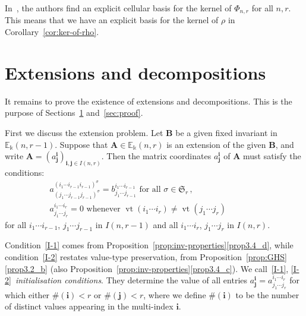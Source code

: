 \documentclass[ALCO,ThmDefs,Unicode,epreuves]{cedram}
\DeclareMathOperator{\vt}{vt}
\newcommand{\E}{\mathbb{E}}
\newcommand{\Sym}{\mathfrak{S}}
\newcommand{\bi}{{\boldsymbol{i}}} %
\newcommand{\bj}{{\boldsymbol{j}}}
\newcommand{\bA}{\mathbf{A}}
\newcommand{\bB}{\mathbf{B}}
\begin{document}
In~\cite{BDM:second}, the authors find an explicit cellular basis for
the kernel of $\Phi_{n,r}$ for all $n,r$. This means that we have an
explicit basis for the kernel of $\rho$ in Corollary~\ref{cor:ker-of-rho}. 



\section{Extensions and decompositions}\label{sec:extensions}%
It remains to prove the existence of extensions and
decompositions. This is the purpose of Sections~\ref{sec:extensions}
and~\ref{sec:proof}. 

First we discuss the extension problem. Let $\bB$ be a given fixed
invariant in $\E_\Bbbk(n,r-1)$. Suppose that $\bA \in \E_\Bbbk(n,r)$
is an extension of the given $\bB$, and write $\bA =
(a^\bi_\bj)_{\bi,\bj \in I(n,r)}$. Then the matrix coordinates
$a^\bi_\bj$ of $\bA$ must satisfy the conditions:
\begin{align}
 & a^{(i_1\cdots i_{r-1} i_{r-1})^\sigma}_{(j_1\cdots j_{r-1}
 j_{r-1})^\sigma} = b^{i_1\cdots i_{r-1}}_{j_1\cdots j_{r-1}} \text{ for
 all } \sigma \in \Sym_r \, , \tag{I-1} \label{I-1}\\
 & a^{i_1\cdots i_r}_{j_1\cdots j_r} = 0 \text{ whenever }
 \vt(i_1\cdots i_r) \ne \vt(j_1 \cdots j_r) \hspace{2cm}\tag{I-2}\label{I-2}
\end{align}
for all $i_1\cdots i_{r-1}$, $j_1\cdots j_{r-1}$ in $I(n,r-1)$ and all
$i_1\cdots i_r$, $j_1\cdots j_r$ in $I(n,r)$.

Condition~\eqref{I-1} comes from Proposition~\ref{prop:inv-properties}\ref{prop3.4_d},
while condition~\eqref{I-2} restates value-type preservation, from
Proposition~\ref{prop:GHS}\ref{prop3.2_b} (also Proposition~\ref{prop:inv-properties}\ref{prop3.4_c}). We call~\eqref{I-1}, \eqref{I-2}~\emph{initialisation conditions}. They determine the value of all
entries $a^\bi_\bj = a^{i_1 \cdots i_r}_{j_1\cdots j_r}$ for which
either $\#(\bi)<r$ or $\#(\bj)<r$, where we define $\#(\bi)$ to be the
number of distinct values appearing in the multi-index $\bi$. 
\end{document}
